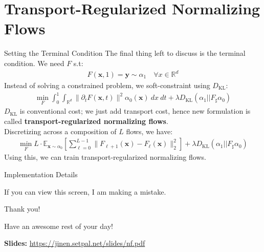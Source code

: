\documentclass{beamer}
\begin{document}
\section{Transport-Regularized Normalizing Flows}

\begin{frame}{Setting the Terminal Condition}
	The final thing left to discuss is the terminal condition. We need $F$ s.t:
	\vspace{-.5em}
	\begin{gather}
		F(\bm{x}, 1) = \bm{y} \sim \alpha_1 \quad \forall x \in \mathbb{R}^d
	\end{gather} \pause
	Instead of solving a constrained problem, we soft-constraint using $D_{\mathrm{KL}}$:
	\vspace{-.5em}
	\begin{gather}
		\min_{F} \int_0^1 \int_{\mathbb{R}^d} \| \partial_t F(\bm{x}, t) \|^2 \alpha_0(\bm{x}) ~dx~dt + \lambda D_{\mathrm{KL}}(\alpha_1 || F_\sharp \alpha_0)
	\end{gather}
	$D_{\mathrm{KL}}$ is conventional cost; we just add transport cost, hence new formulation is called \textbf{transport-regularized normalizing flows}. \pause \newline \\

	Discretizing across a composition of $L$ flows, we have:
	\vspace{-.5em}
	\begin{gather}
		\min_{F} L \cdot \mathbb{E}_{\bm{x} \sim \alpha_0} \left[ \sum^{L - 1}_{\ell = 0} \| F_{\ell + 1}(\bm{x}) - F_{\ell}(\bm{x}) \|_2^2 \right] + \lambda D_{\mathrm{KL}}(\alpha_1 || F_\sharp \alpha_0)
	\end{gather}
	Using this, we can train transport-regularized normalizing flows.
\end{frame}

\begin{frame}{Implementation Details}
	\begin{center}
		If you can view this screen, I am making a mistake.
	\end{center}
\end{frame}

\begin{frame}{Thank you!}
	\begin{center}
		Have an awesome rest of your day!
	\end{center}
	\begin{center}
		\textbf{Slides:} \url{https://jinen.setpal.net/slides/nf.pdf}
	\end{center}
\end{frame}
\end{document}
